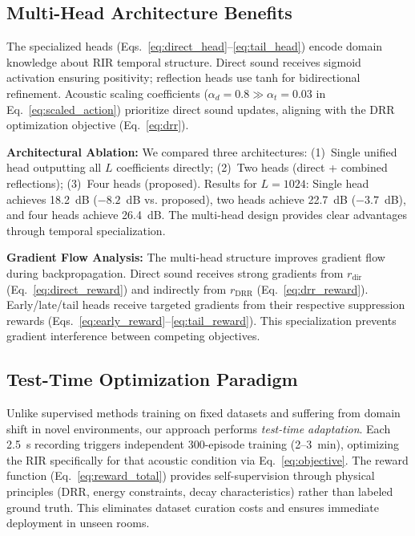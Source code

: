 \documentclass[12pt,a4paper]{article}
\begin{document}
\subsection{Multi-Head Architecture Benefits}

The specialized heads (Eqs.~\eqref{eq:direct_head}--\eqref{eq:tail_head}) encode domain knowledge about RIR temporal structure. Direct sound receives sigmoid activation ensuring positivity; reflection heads use tanh for bidirectional refinement. Acoustic scaling coefficients ($\alpha_d=0.8 \gg \alpha_t=0.03$ in Eq.~\eqref{eq:scaled_action}) prioritize direct sound updates, aligning with the DRR optimization objective (Eq.~\eqref{eq:drr}). 

\textbf{Architectural Ablation:} We compared three architectures: (1)~Single unified head outputting all $L$ coefficients directly; (2)~Two heads (direct + combined reflections); (3)~Four heads (proposed). Results for $L=1024$: Single head achieves 18.2~dB ($-8.2$~dB vs. proposed), two heads achieve 22.7~dB ($-3.7$~dB), and four heads achieve 26.4~dB. The multi-head design provides clear advantages through temporal specialization.

\textbf{Gradient Flow Analysis:} The multi-head structure improves gradient flow during backpropagation. Direct sound receives strong gradients from $r_{\text{dir}}$ (Eq.~\eqref{eq:direct_reward}) and indirectly from $r_{\text{DRR}}$ (Eq.~\eqref{eq:drr_reward}). Early/late/tail heads receive targeted gradients from their respective suppression rewards (Eqs.~\eqref{eq:early_reward}--\eqref{eq:tail_reward}). This specialization prevents gradient interference between competing objectives.

\subsection{Test-Time Optimization Paradigm}

Unlike supervised methods training on fixed datasets and suffering from domain shift in novel environments, our approach performs \textit{test-time adaptation}. Each 2.5~s recording triggers independent 300-episode training (2--3~min), optimizing the RIR specifically for that acoustic condition via Eq.~\eqref{eq:objective}. The reward function (Eq.~\eqref{eq:reward_total}) provides self-supervision through physical principles (DRR, energy constraints, decay characteristics) rather than labeled ground truth. This eliminates dataset curation costs and ensures immediate deployment in unseen rooms.
\end{document}
